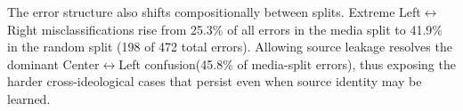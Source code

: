 The error structure also shifts compositionally between splits. Extreme Left$\leftrightarrow$Right misclassifications rise from 25.3\% of all errors in the media split to 41.9\% in the random split (198 of 472 total errors). Allowing source leakage resolves the dominant Center$\leftrightarrow$Left confusion(45.8\% of media-split errors), thus exposing the harder cross-ideological cases that persist even when source identity may be learned. 